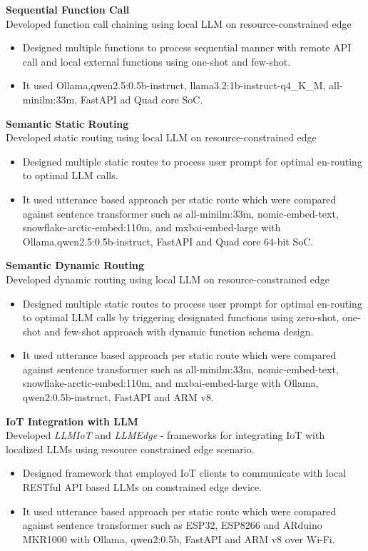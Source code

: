 \documentclass[10pt,a4paper]{article}
\begin{document}
	\textbf{Sequential Function Call} \hfill \textit{}\\
	Developed function call chaining using local LLM on resource-constrained edge
	\begin{itemize}[leftmargin=0.2in]
		\item Designed multiple functions to process sequential manner with remote API call and local external functions using one-shot and few-shot.
		\item It used Ollama,qwen2.5:0.5b-instruct, llama3.2:1b-instruct-q4\_K\_M, all-minilm:33m, FastAPI ad Quad core  SoC.
		
	\end{itemize}
	
	\textbf{Semantic Static Routing} \hfill \textit{}\\
	Developed static routing using local LLM on resource-constrained edge
	\begin{itemize}[leftmargin=0.2in]
		\item Designed multiple static routes to process user prompt for optimal en-routing to optimal LLM calls.
		\item It used utterance based approach per static route which were compared against sentence transformer such as all-minilm:33m, nomic-embed-text, snowflake-arctic-embed:110m, and mxbai-embed-large
		with Ollama,qwen2.5:0.5b-instruct, FastAPI and Quad core 64-bit SoC.
		
	\end{itemize}
	
	
	\textbf{Semantic Dynamic Routing} \hfill \textit{}\\
	Developed dynamic routing using local LLM on resource-constrained edge
	\begin{itemize}[leftmargin=0.2in]
		\item Designed multiple static routes to process user prompt for optimal en-routing to optimal LLM calls by triggering designated functions using zero-shot, one-shot and few-shot approach with dynamic function schema design.
		\item It used utterance based approach per static route which were compared against sentence transformer such as all-minilm:33m, nomic-embed-text, snowflake-arctic-embed:110m, and mxbai-embed-large
		with Ollama, qwen2:0.5b-instruct, FastAPI and ARM v8. 
		
	\end{itemize}
	
	\textbf{IoT Integration with LLM} \hfill \textit{}\\
	Developed \textit{LLMIoT} and \textit{LLMEdge} - frameworks for integrating IoT with localized LLMs using resource constrained edge scenario.
	\begin{itemize}[leftmargin=0.2in]
		\item Designed framework that employed IoT clients to communicate with local RESTful API based LLMs on constrained edge device.
		\item It used utterance based approach per static route which were compared against sentence transformer such as ESP32, ESP8266 and ARduino MKR1000 with Ollama, qwen2:0.5b, FastAPI and ARM v8 over Wi-Fi. 
		
	\end{itemize}
	
\end{document}
